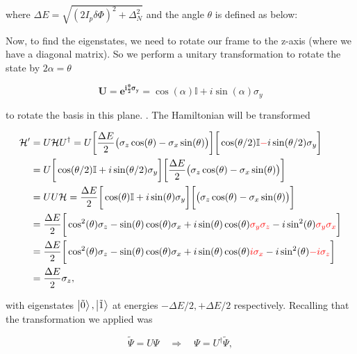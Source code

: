 \noindent where $ \Delta E = \sqrt{(2I_p\delta\Phi)^2+\Delta_N^2}  $ and the angle $ \theta $ is defined as below:



\noindent Now, to find the eigenstates, we need to rotate our frame to the z-axis (where we have a diagonal matrix). So we perform a unitary transformation to rotate the state by $ 2\alpha = \theta $ 

\begin{equation}
\mathbf{U=e^{i\frac{\theta}{2}\sigma_y}} =  \cos(\alpha)\mathbb{I}+i\sin(\alpha)\sigma_y
\end{equation}

\noindent to rotate the basis in this plane. . The {Hamiltonian} will be transformed

\begin{equation}\label{tuneEq1}
\begin{aligned}
\mathcal{H}' & = U\mathcal{H}U^{\dagger} = U \bigg[\frac{\Delta E}{2}\big(\sigma_z\cos(\theta)-\sigma_x\sin(\theta)\big)\bigg]\bigg[\cos(\theta/2)\mathbb{I}{\color{red}{\mathbf{-}}}i\sin(\theta/2)\sigma_y\bigg]\\
& = U \bigg[\cos(\theta/2)\mathbb{I}+i\sin(\theta/2)\sigma_y\bigg]\bigg[\frac{\Delta E}{2}\big(\sigma_z\cos(\theta)-\sigma_x\sin(\theta)\big)\bigg]\\
& = UU\mathcal{H} =\frac{\Delta E}{2} \bigg[\cos(\theta)\mathbb{I}+i\sin(\theta)\sigma_y\bigg]\bigg[\big(\sigma_z\cos(\theta)-\sigma_x\sin(\theta)\big)\bigg]\\
& = \frac{\Delta E}{2}\bigg[\cos^2(\theta)\sigma_z-\sin(\theta)\cos(\theta)\sigma_x+i\sin(\theta)\cos(\theta){\color{red}{\sigma_y\sigma_z}}-i\sin^2(\theta){\color{red}{\sigma_y\sigma_x}}\bigg]\\
& = \frac{\Delta E}{2}\bigg[\cos^2(\theta)\sigma_z-\sin(\theta)\cos(\theta)\sigma_x+i\sin(\theta)\cos(\theta){\color{red}{i\sigma_x}}-i\sin^2(\theta){\color{red}{-i\sigma_z}}\bigg]\\
& = \frac{\Delta E}{2}\sigma_z,
\end{aligned}
\end{equation}


\noindent with eigenstates  $ \Ket{\tilde{0}}, \Ket{\tilde{1}} $ at energies $ -\Delta E/2, +\Delta E/2 $ respectively. Recalling that the transformation we applied was

\begin{equation}
\tilde{\Psi} = U\Psi \quad\Rightarrow\quad \Psi = U^{\dagger}\tilde{\Psi},
\end{equation}

